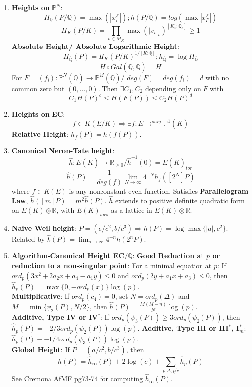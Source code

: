 \documentclass{article}
\newcommand{\Q}{\mathbb{Q}}
\newcommand{\R}{\mathbb{R}}
\newcommand{\Z}{\mathbb{Z}}
\newcommand{\PP}{\mathbb{P}}
\newcommand{\ra}{\rightarrow}
\newcommand{\Ra}{\Rightarrow}
\newcommand{\ACK}{\overline{K}}
\begin{document}
\begin{multicols}{2}
\begin{enumerate}
\item \textbf{Heights on $\PP^N$}:\\
\[H_\Q(P/\Q) = \max(|x_i^\Z|); h(P/\Q) = log(\max|x^\Z_P|)\]
\[H_K(P/K) = \prod_{v \in M_K} \max(|x_i|_v)^{[K_v:\Q_v]} \geq 1\]
\textbf{Absolute Height/ Absolute Logarithmic Height}: 
\[H_{\overline{\Q}}(P) = H_K(P/K)^{1/[K:\Q]}; h_{\overline{\Q}} = \log H_{\overline{\Q}}\]
\[H \circ Gal(\overline{\Q},\Q) = H\]  
For $F = (f_i):\PP^N(\overline{\Q}) \ra \PP^M(\overline{\Q})$/ $deg(F) = deg(f_i) = d$ with no common zero but $(0,\ldots,0)$. Then $\exists C_1,C_2$ depending only on $F$ with
\[C_1H(P)^{d} \leq H(F(P)) \leq C_2 H(P)^d\]

\item \textbf{Heights on EC}: 
\[f \in \ACK(E/K) \Ra \exists f: E \ra^{surj} \PP^1(\ACK)\] 
\textbf{Relative Height}: $h_f(P) = h(f(P))$.

\item \textbf{Canonical Neron-Tate height}: 
\[\hat{h}: E(\overline{K}) \ra \R_{\geq 0}/\hat{h}^{-1}(0) = E(\overline{K})_{tor}\]
\[\hat{h}(P) = \frac{1}{deg(f)} \lim_{N \ra \infty} 4^{-N} h_f([2^N]P)\] 
where $f \in K(E)$ is any nonconstant even function. Satisfies \textbf{Parallelogram Law}, $\hat{h}([m]P) = m^2 \hat{h}(P)$. $\hat{h}$ extends to positive definite quadratic form on $E(K) \otimes \R$, with $E(K)_{tors}$ as a lattice in $E(K) \otimes \R$. 

\item \textbf{Naive Weil height}: $P = (a/c^2,b/c^3) \Ra h(P) = \log\max\{|a|,c^2\}$. Related by $\hat{h}(P) = \lim_{n \ra \infty} 4^{-n}h(2^nP)$. 

\item \textbf{Algorithm-Canonical Height EC$/\Q$}: 
\textbf{Good Reduction at $p$ or reduction to a non-singular point}: For a minimal equation at $p$: If $ord_p(3x^2 + 2a_2x + a_4 - a_1y) \leq 0$ and $ord_p(2y+a_1x + a_3) \leq 0$, then $\hat{h}_p(P) = \max\{0, -ord_p(x)\}\log(p)$. \\
\textbf{Multiplicative}: If $ord_p(c_4) = 0$, set $N = ord_p(\Delta)$ and $M = \min\{\psi_2(P), N/2\}$, then $\hat{h}(P) = \frac{M(M-n)}{N}\log(p)$. \\
\textbf{Additive, Type IV or IV$^*$}: If $ord_p(\psi_3(P)) \geq 3ord_p(\psi_2(P))$, then $\hat{h}_p(P) = -2/3ord_p(\psi_2(P))\log(p)$. 
\textbf{Additive, Type III or III$^*$, I$_m^*$}: $\hat{h}_p(P) - -1/4 ord_p(\psi_3(P))\log(p)$. \\

\textbf{Global Height}: If $P = (a/c^2,b/c^3)$, then 
\[\hat{h}(P) = \hat{h}_\infty(P) + 2\log(c) + \sum_{p|\Delta, p \not|c} \hat{h}_p(P)\]
See Cremona AfMF pg73-74 for computing $\hat{h}_\infty(P)$.


\end{enumerate}
\end{multicols}
\end{document}
